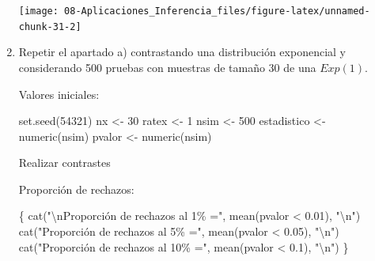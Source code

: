 \documentclass[
]{book}
\newenvironment{Shaded}{\begin{snugshade}}{\end{snugshade}}
\newcommand{\ControlFlowTok}[1]{\textcolor[rgb]{0.13,0.29,0.53}{\textbf{#1}}}
\newcommand{\DecValTok}[1]{\textcolor[rgb]{0.00,0.00,0.81}{#1}}
\newcommand{\FloatTok}[1]{\textcolor[rgb]{0.00,0.00,0.81}{#1}}
\newcommand{\FunctionTok}[1]{\textcolor[rgb]{0.00,0.00,0.00}{#1}}
\newcommand{\NormalTok}[1]{#1}
\newcommand{\OtherTok}[1]{\textcolor[rgb]{0.56,0.35,0.01}{#1}}
\newcommand{\SpecialCharTok}[1]{\textcolor[rgb]{0.00,0.00,0.00}{#1}}
\newcommand{\StringTok}[1]{\textcolor[rgb]{0.31,0.60,0.02}{#1}}
\theoremstyle{break}
\theoremstyle{definition}
\theoremstyle{definition}
\theoremstyle{definition}
\theoremstyle{definition}
\theoremstyle{remark}
\begin{document}
\begin{enumerate}
  \begin{center}\texttt{[image: 08-Aplicaciones\_Inferencia\_files/figure-latex/unnamed-chunk-31-2]} \end{center}
\item
  Repetir el apartado a) contrastando una distribución exponencial
  y considerando 500 pruebas con muestras de tamaño 30 de una \(Exp(1)\).

  Valores iniciales:

\begin{Shaded}
\begin{Highlighting}[]
\FunctionTok{set.seed}\NormalTok{(}\DecValTok{54321}\NormalTok{)}
\NormalTok{nx }\OtherTok{\textless{}{-}} \DecValTok{30}
\NormalTok{ratex }\OtherTok{\textless{}{-}} \DecValTok{1}
\NormalTok{nsim }\OtherTok{\textless{}{-}} \DecValTok{500}
\NormalTok{estadistico }\OtherTok{\textless{}{-}} \FunctionTok{numeric}\NormalTok{(nsim)}
\NormalTok{pvalor }\OtherTok{\textless{}{-}} \FunctionTok{numeric}\NormalTok{(nsim)}
\end{Highlighting}
\end{Shaded}

  Realizar contrastes

\begin{Shaded}
\end{Shaded}

  Proporción de rechazos:

\begin{Shaded}
\begin{Highlighting}[]
\NormalTok{\{}
  \FunctionTok{cat}\NormalTok{(}\StringTok{"}\SpecialCharTok{\textbackslash{}n}\StringTok{Proporción de rechazos al 1\% ="}\NormalTok{, }\FunctionTok{mean}\NormalTok{(pvalor }\SpecialCharTok{\textless{}} \FloatTok{0.01}\NormalTok{), }\StringTok{"}\SpecialCharTok{\textbackslash{}n}\StringTok{"}\NormalTok{)}
  \FunctionTok{cat}\NormalTok{(}\StringTok{"Proporción de rechazos al 5\% ="}\NormalTok{, }\FunctionTok{mean}\NormalTok{(pvalor }\SpecialCharTok{\textless{}} \FloatTok{0.05}\NormalTok{), }\StringTok{"}\SpecialCharTok{\textbackslash{}n}\StringTok{"}\NormalTok{)}
  \FunctionTok{cat}\NormalTok{(}\StringTok{"Proporción de rechazos al 10\% ="}\NormalTok{, }\FunctionTok{mean}\NormalTok{(pvalor }\SpecialCharTok{\textless{}} \FloatTok{0.1}\NormalTok{), }\StringTok{"}\SpecialCharTok{\textbackslash{}n}\StringTok{"}\NormalTok{)}
\NormalTok{\}}
\end{Highlighting}
\end{Shaded}


\end{enumerate}
\end{document}
